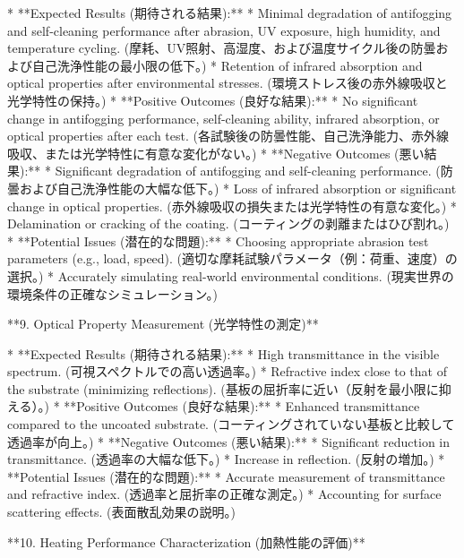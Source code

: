 \documentclass{article}
\begin{document}
*   **Expected Results (期待される結果):**
    *   Minimal degradation of antifogging and self-cleaning performance after abrasion, UV exposure, high humidity, and temperature cycling. (摩耗、UV照射、高湿度、および温度サイクル後の防曇および自己洗浄性能の最小限の低下。)
    *   Retention of infrared absorption and optical properties after environmental stresses. (環境ストレス後の赤外線吸収と光学特性の保持。)
*   **Positive Outcomes (良好な結果):**
    *   No significant change in antifogging performance, self-cleaning ability, infrared absorption, or optical properties after each test. (各試験後の防曇性能、自己洗浄能力、赤外線吸収、または光学特性に有意な変化がない。)
*   **Negative Outcomes (悪い結果):**
    *   Significant degradation of antifogging and self-cleaning performance. (防曇および自己洗浄性能の大幅な低下。)
    *   Loss of infrared absorption or significant change in optical properties. (赤外線吸収の損失または光学特性の有意な変化。)
    *   Delamination or cracking of the coating. (コーティングの剥離またはひび割れ。)
*   **Potential Issues (潜在的な問題):**
    *   Choosing appropriate abrasion test parameters (e.g., load, speed). (適切な摩耗試験パラメータ（例：荷重、速度）の選択。)
    *   Accurately simulating real-world environmental conditions. (現実世界の環境条件の正確なシミュレーション。)

**9. Optical Property Measurement (光学特性の測定)**

*   **Expected Results (期待される結果):**
    *   High transmittance in the visible spectrum. (可視スペクトルでの高い透過率。)
    *   Refractive index close to that of the substrate (minimizing reflections). (基板の屈折率に近い（反射を最小限に抑える）。)
*   **Positive Outcomes (良好な結果):**
    *   Enhanced transmittance compared to the uncoated substrate. (コーティングされていない基板と比較して透過率が向上。)
*   **Negative Outcomes (悪い結果):**
    *   Significant reduction in transmittance. (透過率の大幅な低下。)
    *   Increase in reflection. (反射の増加。)
*   **Potential Issues (潜在的な問題):**
    *   Accurate measurement of transmittance and refractive index. (透過率と屈折率の正確な測定。)
    *   Accounting for surface scattering effects. (表面散乱効果の説明。)

**10. Heating Performance Characterization (加熱性能の評価)**
\end{document}
